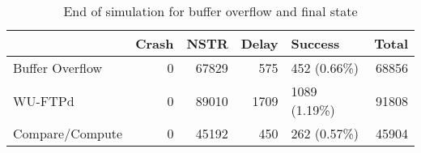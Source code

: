 \begin{table}[H]
\centering
\caption{End of simulation for buffer overflow and final state}
\label{table:end_sim_by_status}
\begin{tabular}{lrrrlr}
\toprule
 & Crash & NSTR & Delay & Success & Total \\
\midrule
Buffer Overflow & 0 & 67829 & 575 & 452 (0.66\%) & 68856 \\
WU-FTPd & 0 & 89010 & 1709 & 1089 (1.19\%) & 91808 \\
Compare/Compute & 0 & 45192 & 450 & 262 (0.57\%) & 45904 \\
\bottomrule
\end{tabular}
\end{table}
